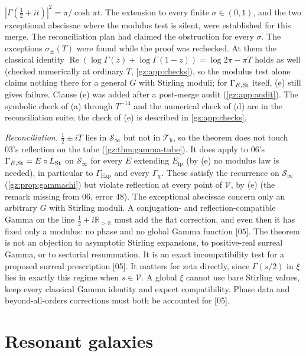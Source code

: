 \documentclass[11pt,a4paper]{article}
\numberwithin{equation}{section}
\theoremstyle{definition}
\theoremstyle{remark}
\newcommand{\R}{\mathbb R}
\renewcommand{\Re}{\operatorname{Re}}
\newcommand{\Exp}{\operatorname{Exp}}
\newcommand{\Efp}{E_{\mathrm{fp}}}
\newcommand{\LSt}{L_{\mathrm{St}}}
\newcommand{\Th}{\mathcal T_{\mathrm h}}
\newcommand{\Sinf}{\mathcal S_{\infty}}
\newcommand{\Vs}{\mathcal V}
\newcommand{\src}[1]{\textup{[#1]}}
\begin{document}
$|\Gamma(\tfrac12+it)|^2=\pi/\cosh\pi t$. The extension to every finite
$\sigma\in(0,1)$, and the two exceptional abscissae where the modulus test
is silent, were established for this merge. The reconciliation plan had
claimed the obstruction for every $\sigma$. The exceptions $\sigma_\pm(T)$
were found while the proof was rechecked. At them the classical identity
$\Re(\log\Gamma(z)+\log\Gamma(1-z))=\log2\pi-\pi T$ holds as well (checked
numerically at ordinary $T$, \cref{gz:app:checks}), so the modulus test alone
claims nothing there for a general $G$ with Stirling moduli; for
$\Gamma_{E,\rm St}$ itself, (e) still gives failure. Clause (e) was added
after a post-merge audit (\cref{gz:app:audit}). The symbolic check of (a)
through $T^{-14}$ and the numerical check of (d) are in the reconciliation
suite; the check of (e) is described in \cref{gz:app:checks}.

\emph{Reconciliation.} $\tfrac12\pm iT$ lies in $\Sinf$ but not in $\Th$, so
the theorem does not touch 03's reflection on the tube
(\cref{gz:thm:gamma-tube}). It does apply to 06's $\Gamma_{E,\rm St}=E\circ\LSt$
on $\Sinf$ for every $E$ extending $\Efp$ (by (e) no modulus law is
needed), in particular to $\Gamma_{\Exp}$ and every $\Gamma_\chi$. These
satisfy the recurrence on $\Sinf$ (\cref{gz:prop:gammachi}) but violate
reflection at every point of $\Vs$, by (e) (the remark missing from 06,
error 48). The exceptional abscissae concern only an arbitrary $G$ with
Stirling moduli. A conjugation-
and reflection-compatible Gamma on the line $\tfrac12+i\R_{>\R}$ must add
the flat correction, and even then it has fixed only a modulus: no phase and
no global Gamma function \src{05}. The theorem is not an objection to
asymptotic Stirling expansions, to positive-real surreal Gamma, or to
sectorial resummation. It is an exact incompatibility test for a proposed
surreal prescription \src{05}. It matters for zeta directly, since
$\Gamma(s/2)$ in $\xi$ lies in exactly this regime when $s\in\Vs$. A global
$\xi$ cannot use bare Stirling values, keep every classical Gamma identity
and expect compatibility. Phase data and beyond-all-orders corrections must
both be accounted for \src{05}.

\section{Resonant galaxies}\label{gz:sec:galaxies}
\end{document}
